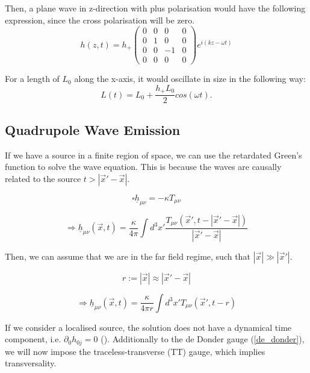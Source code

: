 Then, a plane wave in z-direction with plus polarisation would have the following expression, since the cross polarisation will be zero.
\begin{equation}
    h(z, t) = h_+ 
    \begin{pmatrix}
        0 & 0 & 0 & 0 \\
        0 &1 & 0 & 0 \\
        0 & 0 & -1 & 0 \\
        0 &  0 & 0 & 0
    \end{pmatrix}
    e^{i(k z-\omega t)}
\end{equation}

For a length of $L_0$ along the x-axis, it would oscillate in size in the
following way:
\begin{equation}
    L(t) = L_0 + \frac{h_+ L_0}{2} cos(\omega t).
\end{equation}

\subsection{Quadrupole Wave Emission}
If we have a source in a finite region of space, we can use the retardated Green's function to solve the wave equation. This is because the waves are causally related to the source $t> |\vec{x}'-\vec{x}|$.

\begin{equation}
    \square \underline{h}_{\mu\nu}=-\kappa T_{\mu\nu}
\end{equation}

\begin{equation}
    \Rightarrow \underline{h}_{\mu\nu}(\vec{x}, t) = \frac{\kappa}{4\pi} \int d^3 x' \frac{T_{\mu\nu}(\vec{x}', t-|\vec{x}'-\vec{x}|)}{|\vec{x}'-\vec{x}|}
\end{equation}

Then, we can assume that we are in the far field regime, such that $|\vec{x}| \gg |\vec{x}'|$.

\begin{equation}
    r:= |\vec{x}| \approx |\vec{x}'-\vec{x}|
\end{equation}

\begin{equation}
    \Rightarrow \underline{h}_{\mu\nu}(\vec{x}, t) = \frac{\kappa}{4\pi r} \int d^3 x' T_{\mu\nu}(\vec{x}', t-r)
\end{equation}

If we consider a localised source, the solution does not have a dynamical time component, i.e. $\partial_0 h_{0j} = 0$ (\cite{van_holten_gravitational_2019}).
Additionally to the de Donder gauge (\ref{de_donder}), we will now impose the traceless-transverse (TT) gauge, which implies transversality.

